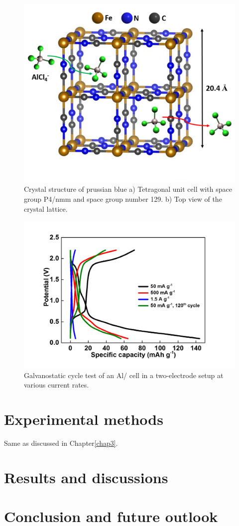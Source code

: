  \begin{figure}[tbh!]
  \centering
  \includegraphics[width=\textwidth]{Figures/chap6fig/pbcrys}
    \caption{Crystal structure of prussian blue a) Tetragonal unit cell with space group P4/nmm and space group number 129. b) Top view of the crystal lattice.}
  \label{Figures/chap6fig:pbcrys}
\end{figure}
 \begin{figure}[tbh!]
  \centering
  \includegraphics[width=\textwidth]{Figures/chap6fig/pbCDC}
    \caption{Galvanostatic cycle test of an Al/ cell in a two-electrode setup at various current rates.}
  \label{Figures/chap6fig:pbCDC}
\end{figure}

\section{Experimental methods}
Same as discussed in Chapter\ref{chap3}.
\section{Results and discussions}
\section{Conclusion and future outlook}